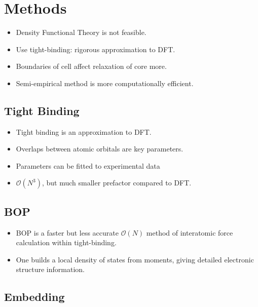 \documentclass[11pt]{article}
\begin{document}
\section*{Methods}
\label{sec:org6d43c5f}
\begin{itemize}
\item Density Functional Theory is not feasible.
\item Use tight-binding: rigorous approximation to DFT.

\item Boundaries of cell affect relaxation of core more.
\item Semi-empirical method is more computationally efficient.
\end{itemize}



\subsection*{Tight Binding}
\label{sec:orge1212fd}


\begin{itemize}
\item Tight binding is an approximation to DFT.
\item Overlaps between atomic orbitals are key parameters.
\item Parameters can be fitted to experimental data
\item \(\mathcal{O}(N^3)\), but much smaller prefactor compared to DFT.
\end{itemize}

\subsection*{BOP}
\label{sec:org810310a}

\begin{itemize}
\item BOP is a faster but less accurate \(\mathcal{O}(N)\) method of interatomic
force calculation within tight-binding.
\item One builds a local density of states from moments, giving detailed
electronic structure information.
\end{itemize}


\subsection*{Embedding}
\label{sec:orgae8e992}
\end{document}
